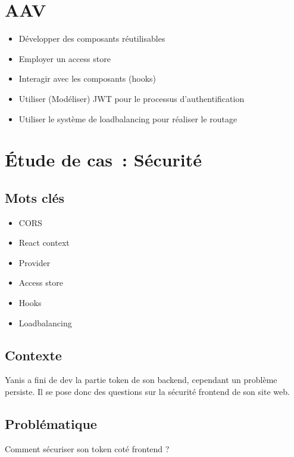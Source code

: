 \newpage

\section*{AAV}
\begin{itemize}
	\item [6] Développer des composants réutilisables
	\item [3] Employer un access store
	\item [5] Interagir avec les composants (hooks)
	\item [5] Utiliser (Modéliser) JWT pour le processus d'authentification
	\item [4] Utiliser le système de loadbalancing pour réaliser le routage
\end{itemize}

\newpage

\section*{Étude de cas~: Sécurité}

\subsection*{Mots clés}
{}
\begin{itemize}
	\item CORS
	\item React context
	\item Provider
	\item Access store
	\item Hooks
	\item Loadbalancing
\end{itemize}

\subsection*{Contexte}
{}
\noindent Yanis a fini de dev la partie token de son backend, cependant un problème persiste. Il se pose donc des questions sur la sécurité frontend de son site web.

\subsection*{Problématique}
{}
\noindent Comment sécuriser son token coté frontend ?

